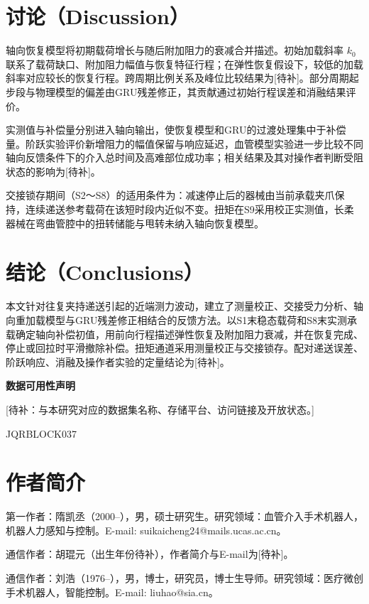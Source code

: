 \section{讨论（Discussion）}


轴向恢复模型将初期载荷增长与随后附加阻力的衰减合并描述。初始加载斜率 $k_0$ 联系了载荷缺口、附加阻力幅值与恢复特征行程；在弹性恢复假设下，较低的加载斜率对应较长的恢复行程。跨周期比例关系及峰位比较结果为[待补]。部分周期起步段与物理模型的偏差由GRU残差修正，其贡献通过初始行程误差和消融结果评价。





实测值与补偿量分别进入轴向输出，使恢复模型和GRU的过渡处理集中于补偿量。阶跃实验评价新增阻力的幅值保留与响应延迟，血管模型实验进一步比较不同轴向反馈条件下的介入总时间及高难部位成功率；相关结果及其对操作者判断受阻状态的影响为[待补]。





交接锁存期间（S2～S8）的适用条件为：减速停止后的器械由当前承载夹爪保持，连续递送参考载荷在该短时段内近似不变。扭矩在S9采用校正实测值，长柔器械在弯曲管腔中的扭转储能与甩转未纳入轴向恢复模型。




\section{结论（Conclusions）}


本文针对往复夹持递送引起的近端测力波动，建立了测量校正、交接受力分析、轴向重加载模型与GRU残差修正相结合的反馈方法。以S1末稳态载荷和S8末实测承载确定轴向补偿初值，用前向行程描述弹性恢复及附加阻力衰减，并在恢复完成、停止或回拉时平滑撤除补偿。扭矩通道采用测量校正与交接锁存。配对递送误差、阶跃响应、消融及操作者实验的定量结论为[待补]。




\noindent
\textbf{数据可用性声明}


[待补：与本研究对应的数据集名称、存储平台、访问链接及开放状态。]








JQRBLOCK037



\section*{作者简介}
 第一作者：隋凯丞（2000--），男，硕士研究生。研究领域：血管介入手术机器人，机器人力感知与控制。E-mail: suikaicheng24@mails.ucas.ac.cn。



通信作者：胡琨元（出生年份待补），作者简介与E-mail为[待补]。




 通信作者：刘浩（1976--），男，博士，研究员，博士生导师。研究领域：医疗微创手术机器人，智能控制。E-mail: liuhao@sia.cn。




